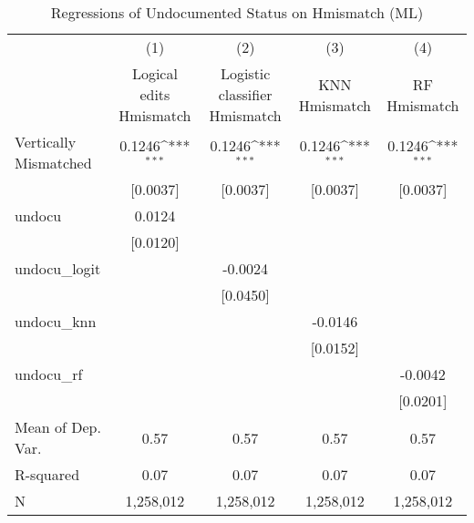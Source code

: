 \begin{table}[htbp]\centering
\def\sym#1{\ifmmode^{#1}\else\(^{#1}\)\fi}
\caption{Regressions of Undocumented Status on Hmismatch (ML)}
\begin{tabular}{l*{4}{c}}
\toprule
                    &\multicolumn{1}{c}{(1)}         &\multicolumn{1}{c}{(2)}         &\multicolumn{1}{c}{(3)}         &\multicolumn{1}{c}{(4)}         \\
                    &Logical edits Hmismatch         &Logistic classifier Hmismatch         &KNN Hmismatch         &RF Hmismatch         \\
\midrule
Vertically Mismatched&      0.1246\sym{***}&      0.1246\sym{***}&      0.1246\sym{***}&      0.1246\sym{***}\\
                    &    [0.0037]         &    [0.0037]         &    [0.0037]         &    [0.0037]         \\
\addlinespace
undocu              &      0.0124         &                     &                     &                     \\
                    &    [0.0120]         &                     &                     &                     \\
\addlinespace
undocu\_logit        &                     &     -0.0024         &                     &                     \\
                    &                     &    [0.0450]         &                     &                     \\
\addlinespace
undocu\_knn          &                     &                     &     -0.0146         &                     \\
                    &                     &                     &    [0.0152]         &                     \\
\addlinespace
undocu\_rf           &                     &                     &                     &     -0.0042         \\
                    &                     &                     &                     &    [0.0201]         \\
\midrule
Mean of Dep. Var.   &        0.57         &        0.57         &        0.57         &        0.57         \\
R-squared           &        0.07         &        0.07         &        0.07         &        0.07         \\
N                   &   1,258,012         &   1,258,012         &   1,258,012         &   1,258,012         \\

\end{tabular}
\end{table}
